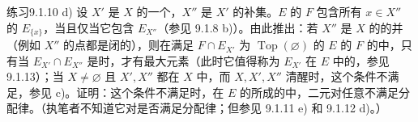 \begin{SGAresult}{练习}{9.1.10}
d) 设 $X'$ 是 $X$ 的一个，$X''$ 是 $X'$ 的补集。$E$ 的 $F$ 包含所有 $x\in X''$ 的 $E_{\{x\}}$，当且仅当它包含 $E_{X''}$（参见 9.1.8 b)）。由此推出：若 $X''$ 是 $X$ 的的并（例如 $X''$ 的点都是闭的），则在满足 $F\cap E_{X'}$ 为 $\operatorname{Top}(\varnothing)$ 的 $E$ 的 $F$ 的中，只有当 $E_{X'}\cap E_{X''}$ 是时，才有最大元素（此时它值得称为 $E_{X'}$ 在 $E$ 中的，参见 9.1.13）；当 $X\ne\varnothing$ 且 $X',X''$ 都在 $X$ 中，而 $X,X',X''$ 清醒时，这个条件不满足，参见 c)。证明：这个条件不满足时，在 $E$ 的所成的中，二元对任意不满足分配律。（执笔者不知道它对是否满足分配律；但参见 9.1.11 e) 和 9.1.12 d)。）
\end{SGAresult}

